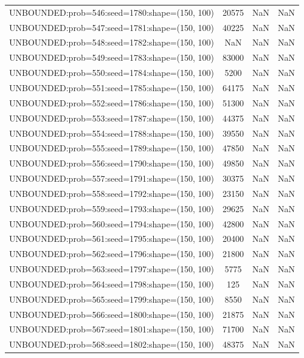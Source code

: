 \begin{longtable}{lccc}
UNBOUNDED:prob=546:seed=1780:shape=(150, 100) & 20575 &   NaN &    NaN \\
UNBOUNDED:prob=547:seed=1781:shape=(150, 100) & 40225 &   NaN &    NaN \\
UNBOUNDED:prob=548:seed=1782:shape=(150, 100) &   NaN &   NaN &    NaN \\
UNBOUNDED:prob=549:seed=1783:shape=(150, 100) & 83000 &   NaN &    NaN \\
UNBOUNDED:prob=550:seed=1784:shape=(150, 100) &  5200 &   NaN &    NaN \\
UNBOUNDED:prob=551:seed=1785:shape=(150, 100) & 64175 &   NaN &    NaN \\
UNBOUNDED:prob=552:seed=1786:shape=(150, 100) & 51300 &   NaN &    NaN \\
UNBOUNDED:prob=553:seed=1787:shape=(150, 100) & 44375 &   NaN &    NaN \\
UNBOUNDED:prob=554:seed=1788:shape=(150, 100) & 39550 &   NaN &    NaN \\
UNBOUNDED:prob=555:seed=1789:shape=(150, 100) & 47850 &   NaN &    NaN \\
UNBOUNDED:prob=556:seed=1790:shape=(150, 100) & 49850 &   NaN &    NaN \\
UNBOUNDED:prob=557:seed=1791:shape=(150, 100) & 30375 &   NaN &    NaN \\
UNBOUNDED:prob=558:seed=1792:shape=(150, 100) & 23150 &   NaN &    NaN \\
UNBOUNDED:prob=559:seed=1793:shape=(150, 100) & 29625 &   NaN &    NaN \\
UNBOUNDED:prob=560:seed=1794:shape=(150, 100) & 42800 &   NaN &    NaN \\
UNBOUNDED:prob=561:seed=1795:shape=(150, 100) & 20400 &   NaN &    NaN \\
UNBOUNDED:prob=562:seed=1796:shape=(150, 100) & 21800 &   NaN &    NaN \\
UNBOUNDED:prob=563:seed=1797:shape=(150, 100) &  5775 &   NaN &    NaN \\
UNBOUNDED:prob=564:seed=1798:shape=(150, 100) &   125 &   NaN &    NaN \\
UNBOUNDED:prob=565:seed=1799:shape=(150, 100) &  8550 &   NaN &    NaN \\
UNBOUNDED:prob=566:seed=1800:shape=(150, 100) & 21875 &   NaN &    NaN \\
UNBOUNDED:prob=567:seed=1801:shape=(150, 100) & 71700 &   NaN &    NaN \\
UNBOUNDED:prob=568:seed=1802:shape=(150, 100) & 48375 &   NaN &    NaN \\

\end{longtable}
